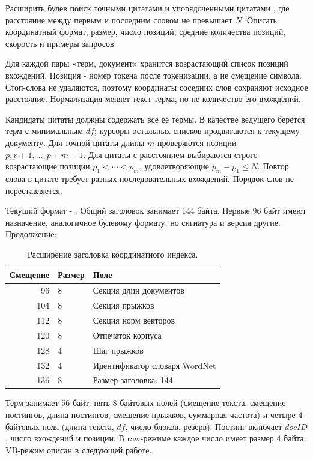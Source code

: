 \task
Расширить булев поиск точными цитатами и упорядоченными цитатами
, где расстояние между первым и последним словом
не превышает \(N\). Описать координатный формат, размер, число
позиций, средние количества позиций, скорость и примеры запросов.

\method
Для каждой пары «терм, документ» хранится возрастающий список позиций
вхождений. Позиция - номер токена после токенизации, а не смещение
символа. Стоп-слова не удаляются, поэтому координаты соседних слов
сохраняют исходное расстояние. Нормализация меняет текст терма,
но не количество его вхождений.

Кандидаты цитаты должны содержать все её термы. В качестве ведущего
берётся терм с минимальным \(df\); курсоры остальных списков продвигаются
к текущему документу. Для точной цитаты длины \(m\) проверяются
позиции \(p,p+1,\ldots,p+m-1\). Для цитаты с расстоянием
выбираются строго возрастающие позиции \(p_1<\cdots<p_m\),
удовлетворяющие \(p_m-p_1\le N\). Повтор слова в цитате требует
разных последовательных вхождений. Порядок слов не переставляется.

Текущий формат - . Общий заголовок занимает 144 байта.
Первые 96 байт имеют назначение, аналогичное булевому формату,
но сигнатура и версия другие. Продолжение:
\begin{table}[H]\centering
\begin{tabular}{rll}\toprule
Смещение & Размер & Поле\\\midrule
96 & 8 & Секция длин документов\\
104 & 8 & Секция прыжков\\
112 & 8 & Секция норм векторов\\
120 & 8 & Отпечаток корпуса\\
128 & 4 & Шаг прыжков\\
132 & 4 & Идентификатор словаря WordNet\\
136 & 8 & Размер заголовка: 144\\\bottomrule
\end{tabular}
\caption{Расширение заголовка координатного индекса.}
\end{table}
Терм занимает 56 байт: пять 8-байтовых полей (смещение текста,
смещение постингов, длина постингов, смещение прыжков, суммарная
частота) и четыре 4-байтовых поля (длина текста, \(df\), число
блоков, резерв). Постинг включает \(docID\), число вхождений и
позиции. В raw-режиме каждое число имеет размер 4 байта;
VB-режим описан в следующей работе.

